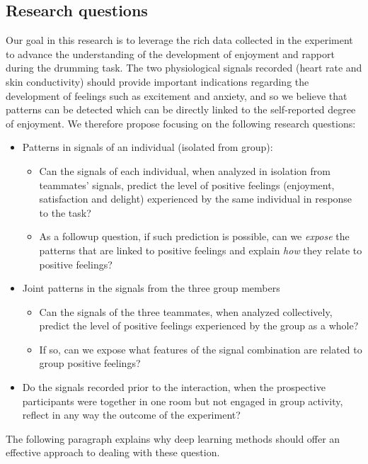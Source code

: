 \documentclass[a4paper, 11pt]{article}      %
\begin{document}
\subsection{Research questions}
Our goal in this research is to leverage the rich data collected in the experiment to advance the understanding of the development of enjoyment and rapport during the drumming task. The two physiological signals recorded (heart rate and skin conductivity) should provide important indications regarding the development of feelings such as excitement and anxiety, and so we believe that patterns can be detected which can be directly linked to the self-reported degree of enjoyment. We therefore propose focusing on the following research questions:
\begin{itemize}
\item 
Patterns in signals of an individual (isolated from group):
\begin{itemize}
    \item 
    Can the signals of each individual, when analyzed in isolation from teammates' signals, predict the level of positive feelings (enjoyment, satisfaction and delight) experienced by the same individual in response to the task?
    \item
    As a followup question, if such prediction is possible, can we \emph{expose} the patterns that are linked to positive feelings and explain \emph{how} they relate to positive feelings?
\end{itemize}
\item Joint patterns in the signals from the three group members
\begin{itemize}
    \item Can the signals of the three teammates, when analyzed collectively, predict the level of positive feelings experienced by the group as a whole? 
    \item If so, can we expose what features of the signal combination are related to group positive feelings?
\end{itemize}

\item
Do the signals recorded prior to the interaction, when the prospective participants were together in one room but not engaged in group activity, reflect in any way the outcome of the experiment?
\end{itemize}

The following paragraph explains why deep learning methods should offer an effective approach to dealing with these question.
\end{document}
